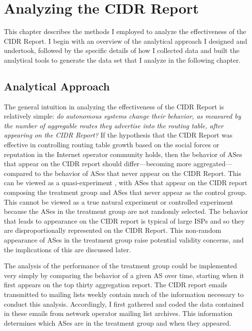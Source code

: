 \chapter{Analyzing the CIDR Report}
\label{chap:method}

This chapter describes the methods I employed to analyze the effectiveness of the CIDR Report. I begin with an overview of the analytical approach I designed and undertook, followed by the specific details of how I collected data and built the analytical tools to generate the data set that I analyze in the following chapter.

\section{Analytical Approach}


The general intuition in analyzing the effectiveness of the CIDR Report is relatively simple: \emph{do autonomous systems change their behavior, as measured by the number of aggregable routes they advertise into the routing table, after appearing on the CIDR Report?} If the hypothesis that the CIDR Report was effective in controlling routing table growth based on the social forces or reputation in the Internet operator community holds, then the behavior of ASes that appear on the CIDR report should differ---becoming more aggregated---compared to the behavior of ASes that never appear on the CIDR Report. This can be viewed as a quasi-experiment \cite{Babbie:2003uq}, with ASes that appear on the CIDR report composing the treatment group and ASes that never appear as the control group. This cannot be viewed as a true natural experiment or controlled experiment because the ASes in the treatment group are not randomly selected. The behavior that leads to appearance on the CIDR report is typical of large ISPs and so they are disproportionally represented on the CIDR Report. This non-random appearance of ASes in the treatment group raise potential validity concerns, and the implications of this are discussed later.

The analysis of the performance of the treatment group could be implemented very simply by comparing the behavior of a given AS over time, starting when it first appears on the top thirty aggregation report. The CIDR report emails transmitted to mailing lists weekly contain much of the information necessary to conduct this analysis. Accordingly, I first gathered and coded the data contained in these emails from network operator mailing list archives. This information determines which ASes are in the treatment group and when they appeared.

